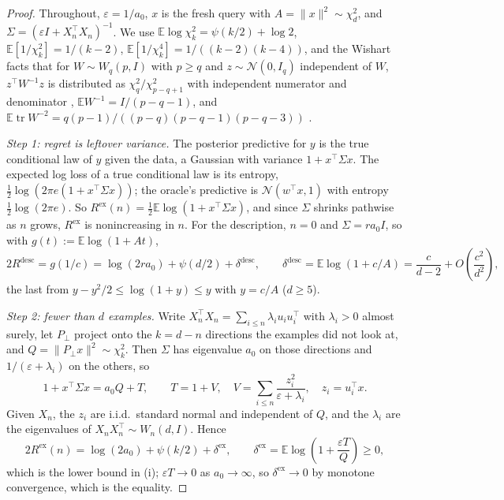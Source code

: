 \documentclass[10pt]{article}
\newcommand{\E}{\mathbb{E}}
\begin{document}
\begin{proof}
Throughout, $\varepsilon = 1/a_0$, $x$ is the fresh query with $A = \|x\|^2 \sim \chi^2_d$, and $\Sigma = (\varepsilon I + X_n^\top X_n)^{-1}$. We use $\E \log \chi^2_k = \psi(k/2) + \log 2$, $\E[1/\chi^2_k] = 1/(k-2)$, $\E[1/\chi^4_k] = 1/((k-2)(k-4))$, and the Wishart facts that for $W \sim W_q(p, I)$ with $p \ge q$ and $z \sim \mathcal{N}(0, I_q)$ independent of $W$, $z^\top W^{-1} z$ is distributed as $\chi^2_q / \chi^2_{p-q+1}$ with independent numerator and denominator \citep[Theorem~3.2.12]{muirhead1982}, $\E W^{-1} = I/(p-q-1)$, and $\E \operatorname{tr} W^{-2} = q(p-1)/((p-q)(p-q-1)(p-q-3))$ \citep{vonrosen1988}.

\emph{Step 1: regret is leftover variance.} The posterior predictive for $y$ is the true conditional law of $y$ given the data, a Gaussian with variance $1 + x^\top \Sigma x$. The expected log loss of a true conditional law is its entropy, $\tfrac12 \log(2\pi e (1 + x^\top \Sigma x))$; the oracle's predictive is $\mathcal{N}(w^\top x, 1)$ with entropy $\tfrac12 \log(2\pi e)$. So $R^{\mathrm{ex}}(n) = \tfrac12 \E \log(1 + x^\top \Sigma x)$, and since $\Sigma$ shrinks pathwise as $n$ grows, $R^{\mathrm{ex}}$ is nonincreasing in $n$. For the description, $n = 0$ and $\Sigma = r a_0 I$, so with $g(t) := \E \log(1 + At)$,
\[
2R^{\mathrm{desc}} = g(1/c) = \log(2 r a_0) + \psi(d/2) + \delta^{\mathrm{desc}},
\qquad
\delta^{\mathrm{desc}} = \E \log(1 + c/A) = \frac{c}{d-2} + O\!\left(\frac{c^2}{d^2}\right),
\]
the last from $y - y^2/2 \le \log(1+y) \le y$ with $y = c/A$ ($d \ge 5$).

\emph{Step 2: fewer than $d$ examples.} Write $X_n^\top X_n = \sum_{i \le n} \lambda_i u_i u_i^\top$ with $\lambda_i > 0$ almost surely, let $P_\perp$ project onto the $k = d - n$ directions the examples did not look at, and $Q = \|P_\perp x\|^2 \sim \chi^2_k$. Then $\Sigma$ has eigenvalue $a_0$ on those directions and $1/(\varepsilon + \lambda_i)$ on the others, so
\[
1 + x^\top \Sigma x = a_0 Q + T, \qquad T = 1 + V, \quad V = \sum_{i \le n} \frac{z_i^2}{\varepsilon + \lambda_i}, \quad z_i = u_i^\top x .
\]
Given $X_n$, the $z_i$ are i.i.d.\ standard normal and independent of $Q$, and the $\lambda_i$ are the eigenvalues of $X_n X_n^\top \sim W_n(d, I)$. Hence
\[
2R^{\mathrm{ex}}(n) = \log(2a_0) + \psi(k/2) + \delta^{\mathrm{ex}}, \qquad \delta^{\mathrm{ex}} = \E \log\!\left(1 + \frac{\varepsilon T}{Q}\right) \ge 0,
\]
which is the lower bound in (i); $\varepsilon T \to 0$ as $a_0 \to \infty$, so $\delta^{\mathrm{ex}} \to 0$ by monotone convergence, which is the equality.


\end{proof}
\end{document}
